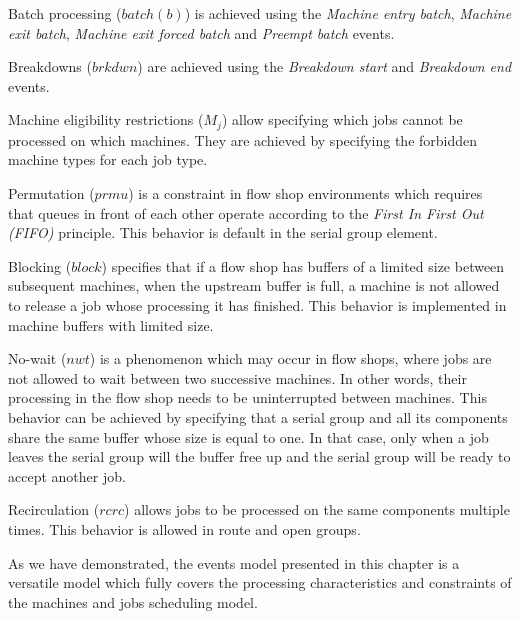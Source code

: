 Batch processing ($batch(b)$) is achieved using the \textit{Machine entry batch}, \textit{Machine exit batch}, \textit{Machine exit forced batch} and \textit{Preempt batch} events.

Breakdowns ($brkdwn$) are achieved using the \textit{Breakdown start} and \textit{Breakdown end} events.

Machine eligibility restrictions ($M_j$) allow specifying which jobs cannot be processed on which machines. They are achieved by specifying the forbidden machine types for each job type.

Permutation ($prmu$) is a constraint in flow shop environments which requires that queues in front of each other operate according to the \textit{First In First Out (FIFO)} principle. This behavior is default in the serial group element.

Blocking ($block$) specifies that if a flow shop has buffers of a limited size between subsequent machines, when the upstream buffer is full, a machine is not allowed to release a job whose processing it has finished. This behavior is implemented in machine buffers with limited size.

No-wait ($nwt$) is a phenomenon which may occur in flow shops, where jobs are not allowed to wait between two successive machines. In other words, their processing in the flow shop needs to be uninterrupted between machines. This behavior can be achieved by specifying that a serial group and all its components share the same buffer whose size is equal to one. In that case, only when a job leaves the serial group will the buffer free up and the serial group will be ready to accept another job.

Recirculation ($rcrc$) allows jobs to be processed on the same components multiple times. This behavior is allowed in route and open groups.

As we have demonstrated, the events model presented in this chapter is a versatile model which fully covers the processing characteristics and constraints of the machines and jobs scheduling model.